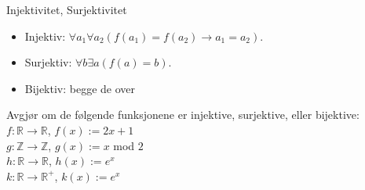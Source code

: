\begin{frame}{Injektivitet, Surjektivitet}
    \begin{itemize}
        \item Injektiv:  $\forall a_1 \forall a_2 (f(a_1) = f(a_2) \rightarrow a_1 = a_2)$.\\
        \item Surjektiv: $\forall b \exists a (f(a) = b)$.\\
        \item Bijektiv: begge de over \\
    \end{itemize}
    
    \begin{block}{Avgjør om de følgende funksjonene er injektive, surjektive, eller bijektive:}
        $f : \mathbb{R} \rightarrow \mathbb{R}$, $f(x) := 2x + 1$\\
        $g : \mathbb{Z} \rightarrow \mathbb{Z}$, $g(x) := x$ mod $2$\\
        $h : \mathbb{R} \rightarrow \mathbb{R}$, $h(x) := e^x$\\
        $k : \mathbb{R} \rightarrow \mathbb{R^+}$, $k(x) := e^x$\\
    \end{block}
\end{frame}

